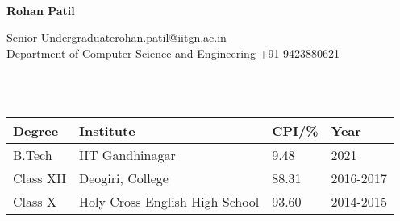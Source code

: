 \documentclass[a4paper,10pt]{awesome-iitgncv}
\begin{document}
\hspace{0.5cm}\\[-0.2cm]
\setlength{\columnsep}{4cm}
\begin{large}
\indent\textbf{Rohan Patil} \\
\end{large}
 \indent Senior Undergraduate\hfill rohan.patil@iitgn.ac.in \\
 \indent Department of Computer Science and Engineering  \hfill +91 9423880621

\\
\\
\begin{tabular}{ p{3.5cm} @{\hskip 0.3in} p{6cm} @{\hskip 0.3in} p{2.85cm} @{\hskip 0.3in} p{2.5cm} }
\hline
\textbf{Degree} & \textbf{Institute} & \textbf{CPI/\%}  & \textbf{Year} \\
\hline
B.Tech & IIT Gandhinagar  & 9.48 & 2021 \\
Class XII & Deogiri, College  & 88.31 & 2016-2017\\
Class X & Holy Cross English High School  & 93.60 & 2014-2015\\
\hline
\end{tabular}








\end{document}

